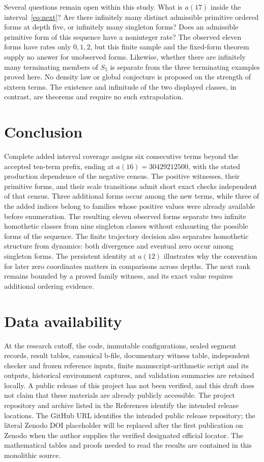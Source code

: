 \documentclass[11pt,a4paper]{article}
\theoremstyle{definition}
\theoremstyle{remark}
\begin{document}
Several questions remain open within this study. What is $a(17)$ inside
the interval~\eqref{eq:next}? Are there infinitely many distinct admissible
primitive ordered forms at depth five, or infinitely many singleton
forms? Does an admissible primitive form of this sequence have a noninteger
rate? The observed eleven forms have rates only $0,1,2$, but this finite
sample and the fixed-form theorem supply no answer for unobserved forms.
Likewise, whether there are infinitely many terminating members of $S_5$
is separate from the three terminating examples proved here. No density
law or global conjecture is proposed on the strength of sixteen terms.
The existence and infinitude of the two displayed classes, in contrast,
are theorems and require no such extrapolation.

\section{Conclusion}\label{sec:conclusion}

Complete added interval coverage assigns six consecutive terms beyond the
accepted ten-term prefix, ending at $a(16)=30429212500$, with the stated
production dependence of the negative census. The positive witnesses,
their primitive forms, and their scale transitions admit short exact
checks independent of that census. Three additional forms occur among
the new terms, while three of the added indices belong to families whose
positive values were already available before enumeration. The resulting
eleven observed forms separate two infinite homothetic classes from nine
singleton classes without exhausting the possible forms of the sequence.
The finite trajectory decision also separates homothetic structure from
dynamics: both divergence and eventual zero occur among singleton forms.
The persistent identity at $a(12)$ illustrates why the convention for
later zero coordinates matters in comparisons across depths. The next
rank remains bounded by a proved family witness, and its exact value
requires additional ordering evidence.

\section*{Data availability}
At the research cutoff, the code, immutable configurations, sealed segment
records, result tables, canonical b-file, documentary witness table,
independent checker and frozen reference inputs, finite manuscript-arithmetic
script and its outputs, historical environment captures, and validation
summaries are retained locally. A public release of this project has not been verified,
and this draft does not claim that these materials are already publicly
accessible. The project repository and archive listed in the References
identify the intended release locations. The GitHub URL identifies the
intended public release repository; the literal Zenodo DOI placeholder
will be replaced after the first publication on Zenodo when the author
supplies the verified designated official locator. The mathematical tables
and proofs needed to read the results are contained in this monolithic source.
\end{document}
